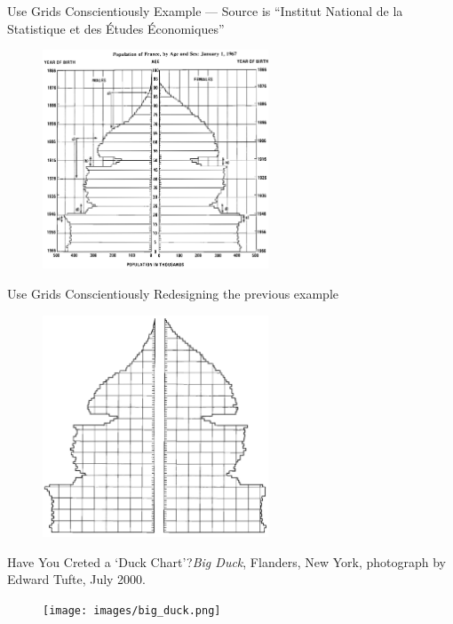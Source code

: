 \documentclass[notes, aspectratio=1610]{beamer}
\begin{document}
\begin{frame}
	{Use Grids Conscientiously}
	{Example --- Source is ``Institut National de la Statistique et des 
	\'Etudes \'Economiques''}
	\centering
	\begin{figure}
	\includegraphics[width=0.6\textwidth]{images/grid_1.png}
	\end{figure}
\end{frame}

\begin{frame}
	{Use Grids Conscientiously}
	{Redesigning the previous example}
	\centering
	\begin{figure}
	\includegraphics[width=0.6\textwidth]{images/grid_2.png}
	\end{figure}
\end{frame}

\begin{frame}{Have You Creted a `Duck Chart'?}{\textit{Big Duck}, Flanders, 
	New York, photograph by Edward Tufte, July 2000.}
	\begin{figure}
		\begin{center}
			\texttt{[image: images/big\_duck.png]}
		\end{center}
	\end{figure}
\end{frame}
\end{document}
